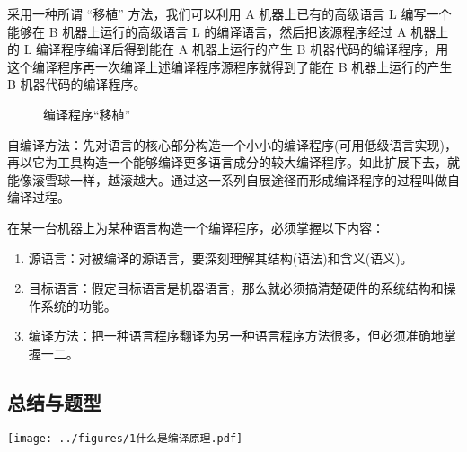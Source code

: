 采用一种所谓 ``移植'' 方法，我们可以利用 A 机器上已有的高级语言 L 编写一个能够在 B 机器上运行的高级语言 L 的编译语言，然后把该源程序经过 A 机器上的 L 编译程序编译后得到能在 A 机器上运行的产生 B 机器代码的编译程序，用这个编译程序再一次编译上述编译程序源程序就得到了能在 B 机器上运行的产生 B 机器代码的编译程序。

\begin{figure}[H]
    \centering
    \caption{编译程序``移植''}
    \label{编译程序``移植''}
\end{figure}

自编译方法：先对语言的核心部分构造一个小小的编译程序(可用低级语言实现)，再以它为工具构造一个能够编译更多语言成分的较大编译程序。如此扩展下去，就能像滚雪球一样，越滚越大。通过这一系列自展途径而形成编译程序的过程叫做自编译过程。

在某一台机器上为某种语言构造一个编译程序，必须掌握以下内容：
\begin{enumerate}
    \item 源语言：对被编译的源语言，要深刻理解其结构(语法)和含义(语义)。
    \item 目标语言：假定目标语言是机器语言，那么就必须搞清楚硬件的系统结构和操作系统的功能。
    \item 编译方法：把一种语言程序翻译为另一种语言程序方法很多，但必须准确地掌握一二。
\end{enumerate}

\subsection{总结与题型}

\texttt{[image: ../figures/1什么是编译原理.pdf]}

\newpage